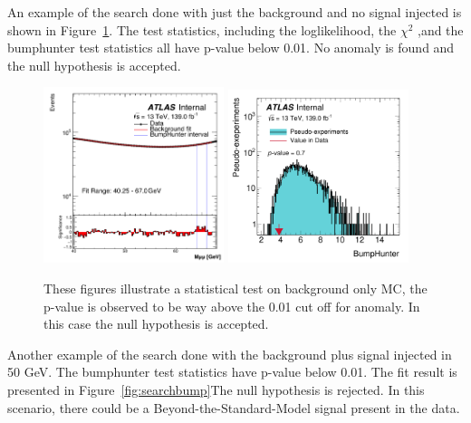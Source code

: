 An example of the search done with just the background and no signal injected is shown in Figure~\ref{fig:searchnull}. The test statistics, including 
the loglikelihood, the $\chi^{2}$ ,and the bumphunter test statistics all have p-value below 0.01. No anomaly is found and the null hypothesis is accepted.
    
\begin{figure}[!htb]
    \begin{center}

        \includegraphics[width=0.47\textwidth]{figures/chapter_dimuon/Nominal}        
        \includegraphics[width=0.47\textwidth]{figures/chapter_dimuon/bumpHunterStatPlot}
        \caption{
        These figures illustrate a statistical test on background only MC, the p-value is observed to be way above the 0.01 cut off for anomaly. In  this case the null hypothesis is accepted.
        }
    \label{fig:searchnull}
    \end{center}
\end{figure}
\FloatBarrier

Another example of the search done with the background plus signal injected in 50 GeV. The bumphunter test statistics have p-value below 0.01. The fit result is presented in Figure~\ref{fig:searchbump}The null hypothesis is rejected. In this scenario, there could be a Beyond-the-Standard-Model signal present in the data.

